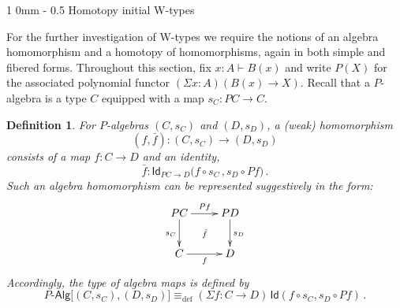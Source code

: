 \documentclass[reqno,10pt,a4paper,oneside]{amsart}
\makeatletter
\numberwithin{equation}{section}
\renewcommand{\section}{\@startsection
  {section}%
   {1}%
  {0mm}%
   {-\baselineskip}%
  {0.5\baselineskip}%
   {\Large\bfseries}}%
\theoremstyle{mythm}
\theoremstyle{mydef}
\newtheorem{definition}[theorem]{Definition}
\theoremstyle{myrmk}
\newcommand{\deq}{\equiv}
\newcommand{\defeq}{\deq_{\mathrm{def}}}
\newcommand{\prd}[1]{\Pi_{#1}}
\newcommand{\lam}[1]{\lambda_{#1}}
\newcommand{\Id}{\mathsf{Id}}
\newcommand{\id}[1]{\Id_{#1}}
\newcommand{\W}{\mathsf{W}}
\newcommand{\wsup}{\mathsf{sup}}
\newcommand{\UU}{\mathsf{U}}
\newcommand{\Palg}{P\text{-}\mathsf{Alg}}
\makeatother
\begin{document}
%



\section{Homotopy initial W-types}

For the further investigation of W-types we require the notions of an algebra homomorphism and a homotopy of homomorphisms, again in both simple and fibered forms.  Throughout this section, fix $x:A\vdash B(x)$ and write $P(X)$ for the associated polynomial functor $(\Sigma x : A) (B(x) \rightarrow X)$.  Recall that a $P$-algebra is a type $C$ equipped with a map
$s_C :  PC \rightarrow C$.  

\begin{definition}
For $P$-algebras $(C,s_C)$ and $(D,s_D)$, a \emph{(weak) 
homomorphism}  $$(f, \bar{f}) : (C, s_C) \rightarrow (D, s_D)$$
consists of a map $f : C \rightarrow D$ and an identity,
\[
\bar{f} : \id{PC \rightarrow D}\big( f \circ s_C \, ,  s_{D} \circ Pf \big) \, .
\]
Such an algebra homomorphism can be represented suggestively in the form:
\[
\xymatrix{
 PC \ar[d]_{s_C} \ar[r]^{Pf}  \ar@{}[dr]|{\bar{f}} &  PD \ar[d]^{s_D}\\
C \ar[r]_{f}   & D }
\] 
Accordingly, the type of algebra maps is defined by
\[
\Palg
\big[ (C,s_C), (D, s_D)  \big]
 \defeq  
(\Sigma f:  C \rightarrow D) \, \Id(f\circ s_C, s_D\circ Pf) \, .
\]
\end{definition}
\medskip
\end{document}
